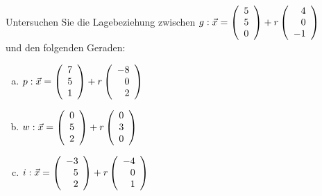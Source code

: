 \begin{aufgabe} ~ \\ 
Untersuchen Sie die Lagebeziehung zwischen $g: \vec{x}=\Vekd{5}{5}{0} + r\Vekd{4}{0}{-1}$\\ und den folgenden Geraden:\begin{enumerate}[a)] 
\item 
$p: \vec{x}=\Vekd{7}{5}{1} + r\Vekd{-8}{0}{2}$
\item 
$w: \vec{x}=\Vekd{0}{5}{2} + r\Vekd{0}{3}{0}$
\item 
$i: \vec{x}=\Vekd{-3}{5}{2} + r\Vekd{-4}{0}{1}$
\end{enumerate} 
\end{aufgabe} 
